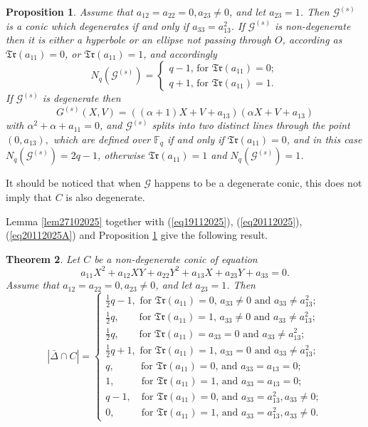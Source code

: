 \documentclass[sn-mathphys-num]{sn-jnl}%
\newtheorem{theorem}{Theorem}
\newtheorem{proposition}[theorem]{Proposition}
\begin{document}
\begin{proposition}
\label{pro12082025B1}
Assume that $a_{12}=a_{22}=0,a_{23}\ne 0$, and let $a_{23}=1$. Then $\mathcal{G}^{(s)}$ is a conic which degenerates if and only if $a_{33}=a_{13}^2$. If  $\mathcal{G}^{(s)}$ is non-degenerate then it is either a hyperbole or an ellipse not passing through $O$, according as $\mathfrak{Tr}(a_{11})=0$, or $\mathfrak{Tr}(a_{11})=1$, and accordingly
$$N_q(\mathcal{G}^{(s)})=
\begin{cases}
{\mbox{$q-1$, for $\mathfrak{Tr}(a_{11})=0$}};\\
{\mbox{$q+1$, for $\mathfrak{Tr}(a_{11})=1$}}.
\end{cases}
$$
If $\mathcal{G}^{(s)}$ is degenerate then
$$G^{(s)}(X,V)=((\alpha+1)X+V+a_{13})(\alpha X+V+a_{13})$$ with $\alpha^2+\alpha+a_{11}=0$, and $\mathcal{G}^{(s)}$ splits into two distinct  lines through the point $(0,a_{13}),$ which are defined over $\mathbb{F}_q$ if and only if $\mathfrak{Tr}(a_{11})=0$, and in this case
$N_q(\mathcal{G}^{(s)})=2q-1$, otherwise  $\mathfrak{Tr}(a_{11})=1$ and $N_q(\mathcal{G}^{(s)})=1$.
\end{proposition}
It should be noticed that when $\mathcal{G}$ happens to be a degenerate conic, this does not imply that $C$ is also degenerate.

Lemma \ref{lem27102025} together with (\ref{eq19112025}), (\ref{eq20112025}), (\ref{eq20112025A}) and Proposition \ref{pro12082025B1} give the following result.

\begin{theorem}
    \label{pro19112025AA} Let $C$ be a non-degenerate conic of equation
$$a_{11}X^2+a_{12}XY+a_{22}Y^2+a_{13}X+a_{23}Y+a_{33}=0.$$ Assume that $a_{12}=a_{22}=0,a_{23}\ne 0$, and  let $a_{23}=1$. Then
$$ |\bar{\Delta}\cap C|=
\begin{cases}
\textstyle{\frac{1}{2}}q-1,\,\,{\mbox{for $\mathfrak{Tr}(a_{11})=0$, $a_{33}\ne 0$  and $a_{33}\ne a_{13}^2$; }} \\
\textstyle{\frac{1}{2}}q,\,\,\quad\,\,\,\, {\mbox{for $\mathfrak{Tr}(a_{11})=1$, $a_{33}\ne 0$  and $a_{33}\ne a_{13}^2$; }} \\
\textstyle{\frac{1}{2}}q,\,\,\quad\,\,\,\,{\mbox{for $\mathfrak{Tr}(a_{11})=a_{33}=0$ and $a_{33}\ne a_{13}^2$; }} \\
\textstyle{\frac{1}{2}}q+1,\,\,{\mbox{for $\mathfrak{Tr}(a_{11})=1$, $a_{33}= 0$  and $a_{33}\ne a_{13}^2$; }} \\
q,\,\,\quad\,\,\,\,\,\,\,\,{\mbox{for $\mathfrak{Tr}(a_{11})=0$,   and $a_{33}=a_{13}=0$;}} \\
1,\,\,\quad\,\,\,\,\,\,\,\,{\mbox{for $\mathfrak{Tr}(a_{11})=1$,   and $a_{33}=a_{13}=0$;}} \\
q-1,\,\,\,\,\,\,{\mbox{for $\mathfrak{Tr}(a_{11})=0$,   and $a_{33}=a_{13}^2, a_{33}\ne 0$;}} \\
0,\,\,\quad\,\,\,\,\,\,\,\,{\mbox{for $\mathfrak{Tr}(a_{11})=1$,   and $a_{33}=a_{13}^2, a_{33}\ne 0$.}}
\end{cases}
$$
\end{theorem}
\end{document}
